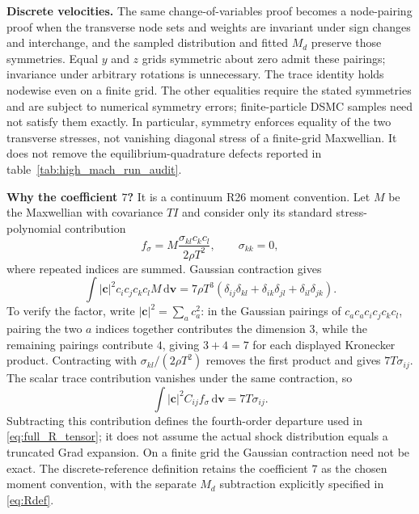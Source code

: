 \documentclass[lineno,paper]{JFM-FLM_Au}
\newenvironment{revision}{\nolinenumbers\begin{tcolorbox}[breakable,colback=revisionyellow,colframe=revisionyellow,boxrule=0pt,arc=0pt,left=5pt,right=5pt,top=5pt,bottom=5pt,before skip=6pt,after skip=6pt]\captionsetup{width=\linewidth}}{\end{tcolorbox}\linenumbers}
\newenvironment{revision}{}{}
\newcommand{\dd}{\mathrm{d}}
\begin{document}
\begin{revision}
\textbf{Discrete velocities.} The same change-of-variables proof becomes a node-pairing proof when the transverse node sets and weights are invariant under sign changes and interchange, and the sampled distribution and fitted $M_d$ preserve those symmetries. Equal $y$ and $z$ grids symmetric about zero admit these pairings; invariance under arbitrary rotations is unnecessary. The trace identity holds nodewise even on a finite grid. The other equalities require the stated symmetries and are subject to numerical symmetry errors; finite-particle DSMC samples need not satisfy them exactly. In particular, symmetry enforces equality of the two transverse stresses, not vanishing diagonal stress of a finite-grid Maxwellian. It does not remove the equilibrium-quadrature defects reported in table~\ref{tab:high_mach_run_audit}.
\end{revision}

\newpage
\begin{revision}
\textbf{Why the coefficient $7$?} It is a continuum R26 moment convention. Let $M$ be the Maxwellian with covariance $T I$ and consider only its standard stress-polynomial contribution
\[
 f_\sigma=M\frac{\sigma_{kl}c_kc_l}{2\rho T^2},\qquad \sigma_{kk}=0,
\]
where repeated indices are summed. Gaussian contraction gives
\begin{equation}
 \int |\boldsymbol c|^2c_ic_jc_kc_l M\,\dd\boldsymbol v
 =7\rho T^3(\delta_{ij}\delta_{kl}+\delta_{ik}\delta_{jl}
                         +\delta_{il}\delta_{jk}).
 \label{eq:gaussian_sixth_contraction}
\end{equation}
To verify the factor, write $|\boldsymbol c|^2=\sum_a c_a^2$: in the Gaussian pairings of $c_a c_a c_i c_j c_k c_l$, pairing the two $a$ indices together contributes the dimension $3$, while the remaining pairings contribute $4$, giving $3+4=7$ for each displayed Kronecker product. Contracting with $\sigma_{kl}/(2\rho T^2)$ removes the first product and gives $7T\sigma_{ij}$. The scalar trace contribution vanishes under the same contraction, so
\[
 \int |\boldsymbol c|^2 C_{ij}f_\sigma\,\dd\boldsymbol v=7T\sigma_{ij}.
\]
Subtracting this contribution defines the fourth-order departure used in \eqref{eq:full_R_tensor}; it does not assume the actual shock distribution equals a truncated Grad expansion. On a finite grid the Gaussian contraction need not be exact. The discrete-reference definition retains the coefficient $7$ as the chosen moment convention, with the separate $M_d$ subtraction explicitly specified in \eqref{eq:Rdef}.
\end{revision}
\end{document}
